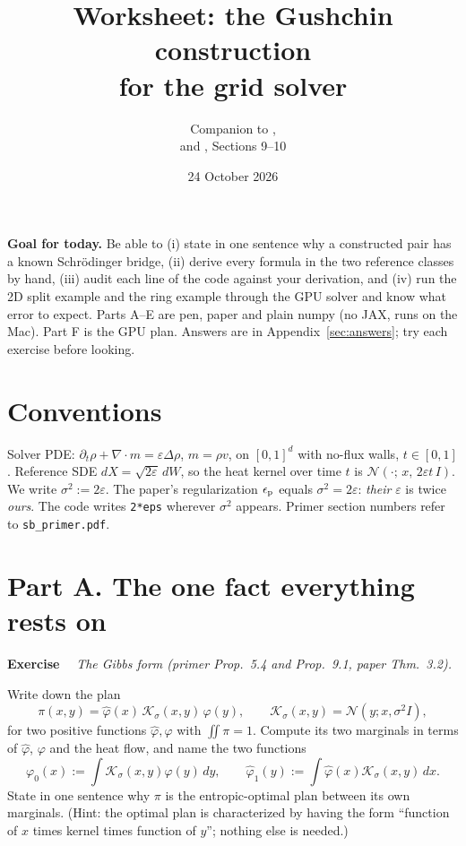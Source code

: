 \documentclass[11pt]{article}
\title{Worksheet: the Gushchin construction\\ for the grid solver}
\author{Companion to \code{python/shared/mixture\_sb.py}, \code{paper\_route\_sb.py}\\
and \code{docs/sb\_primer.tex}, Sections 9--10}
\date{24 October 2026}
\newcommand{\eps}{\varepsilon}
\newcommand{\code}[1]{\texttt{#1}}
\newcommand{\dv}{\nabla\cdot}
\newcommand{\Nc}{\mathcal{N}}
\newcommand{\Kc}{\mathcal{K}}
\newcommand{\hphi}{\hat\varphi}
\newcounter{ex}
\newenvironment{ex}[1]{\refstepcounter{ex}\par\medskip\noindent\textbf{Exercise \theex}\ \ \textit{#1}\par\nopagebreak\smallskip}{\par\medskip}
\begin{document}
\maketitle

\begin{goal}
\textbf{Goal for today.} Be able to (i) state in one sentence why a constructed pair has a
known Schr\"odinger bridge, (ii) derive every formula in the two reference classes by
hand, (iii) audit each line of the code against your derivation, and (iv) run the 2D split
example and the ring example through the GPU solver and know what error to expect.
Parts A--E are pen, paper and plain numpy (no JAX, runs on the Mac). Part F is the GPU plan.
Answers are in Appendix~\ref{sec:answers}; try each exercise before looking.
\end{goal}

\section*{Conventions}
Solver PDE: $\partial_t\rho+\dv m=\eps\Delta\rho$, $m=\rho v$, on $[0,1]^d$ with no-flux
walls, $t\in[0,1]$. Reference SDE $dX=\sqrt{2\eps}\,dW$, so the heat kernel over time $t$
is $\Nc(\cdot;\,x,\,2\eps t\,I)$. We write $\sigma^2:=2\eps$. The paper's regularization
$\epsilon_{\rm p}$ equals $\sigma^2=2\eps$: \emph{their} $\eps$ is twice \emph{ours}. The
code writes \code{2*eps} wherever $\sigma^2$ appears. Primer section numbers refer to
\code{sb\_primer.pdf}.

\section*{Part A. The one fact everything rests on}

\begin{ex}{The Gibbs form (primer Prop.\ 5.4 and Prop.\ 9.1, paper Thm.\ 3.2).}
Write down the plan
\[
  \pi(x,y)=\hphi(x)\,\Kc_\sigma(x,y)\,\varphi(y),\qquad
  \Kc_\sigma(x,y)=\Nc(y;x,\sigma^2I),
\]
for two positive functions $\hphi,\varphi$ with $\iint\pi=1$. Compute its two marginals in
terms of $\hphi$, $\varphi$ and the heat flow, and name the two functions
\[
  \varphi_0(x):=\int\Kc_\sigma(x,y)\varphi(y)\,dy,\qquad \hphi_1(y):=\int\hphi(x)\Kc_\sigma(x,y)\,dx .
\]
State in one sentence why $\pi$ is the entropic-optimal plan between its own marginals.
(Hint: the optimal plan is characterized by having the form ``function of $x$ times kernel
times function of $y$''; nothing else is needed.)
\end{ex}
\end{document}
